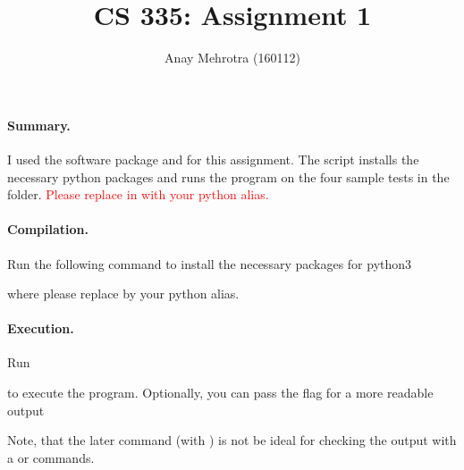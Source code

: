 \documentclass[11pt,letterpaper]{article}
\title{\bf CS 335: Assignment 1}
\author{Anay Mehrotra (160112)}
\newcommand{\redc}[1]{ \textcolor{red} {#1}}
\theoremstyle{definition}
\begin{document}
\date{}


\maketitle

\thispagestyle{empty}
%

\paragraph{Summary.} I used the  software package and  for this assignment.
%
The  script installs the necessary python packages and runs the program on the four sample tests in the  folder.
%
\redc{Please replace } \redc{in}  \redc{with your python alias.}
%

\paragraph{Compilation.}
%
Run the following command to install the necessary packages for python3


\noindent where please replace  by your python alias.


\paragraph{Execution.}
%
%

Run


\noindent to execute the program. Optionally, you can pass the  flag for a more readable output


\noindent Note, that the later command (with ) is not be ideal for checking the output with a  or  commands.

\medskip








% 
% 

\appendix
\end{document}
